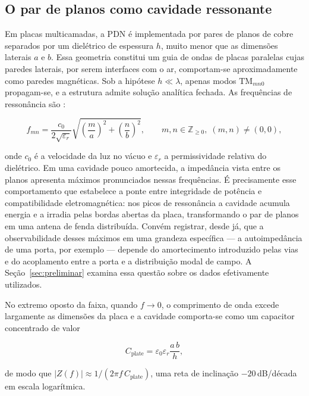 \subsection{O par de planos como cavidade ressonante}

Em placas multicamadas, a PDN é implementada por pares de planos de cobre
separados por um dielétrico de espessura $h$, muito menor que as dimensões
laterais $a$ e $b$. Essa geometria constitui um guia de ondas de placas paralelas
cujas paredes laterais, por serem interfaces com o ar, comportam-se
aproximadamente como paredes magnéticas. Sob a hipótese $h \ll \lambda$, apenas
modos $\text{TM}_{mn0}$ propagam-se, e a estrutura admite solução analítica
fechada. As frequências de ressonância são \citep{swaminathan2020}:

\begin{equation}
f_{mn} = \frac{c_0}{2\sqrt{\varepsilon_r}}
         \sqrt{\left(\frac{m}{a}\right)^2 + \left(\frac{n}{b}\right)^2},
\qquad m,n \in \mathbb{Z}_{\geq 0},\; (m,n) \neq (0,0),
\label{eq:modos}
\end{equation}

\noindent onde $c_0$ é a velocidade da luz no vácuo e $\varepsilon_r$ a
permissividade relativa do dielétrico. Em uma cavidade pouco amortecida, a
impedância vista entre os planos apresenta máximos pronunciados nessas
frequências. É precisamente esse comportamento que estabelece a ponte entre
integridade de potência e compatibilidade eletromagnética: nos picos de
ressonância a cavidade acumula energia e a irradia pelas bordas abertas da placa,
transformando o par de planos em uma antena de fenda distribuída. Convém
registrar, desde já, que a observabilidade desses máximos em uma grandeza
específica — a autoimpedância de uma porta, por exemplo — depende do
amortecimento introduzido pelas vias e do acoplamento entre a porta e a
distribuição modal de campo. A Seção~\ref{sec:preliminar} examina essa questão
sobre os dados efetivamente utilizados.

No extremo oposto da faixa, quando $f \rightarrow 0$, o comprimento de onda
excede largamente as dimensões da placa e a cavidade comporta-se como um
capacitor concentrado de valor

\begin{equation}
C_{\text{plate}} = \varepsilon_0 \varepsilon_r \frac{a\,b}{h},
\label{eq:cplate}
\end{equation}

\noindent de modo que $|Z(f)| \approx 1/(2\pi f\, C_{\text{plate}})$, uma reta de
inclinação $-20$\,dB/década em escala logarítmica.

